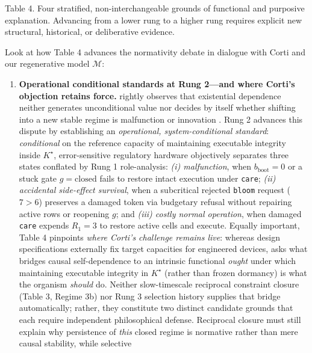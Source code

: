 \documentclass[11pt,a4paper]{article}
\providecommand{\tightlist}{\setlength{\itemsep}{2pt}\setlength{\parskip}{0pt}}
\begin{document}
Table 4. Four stratified, non-interchangeable grounds of functional and
purposive explanation. Advancing from a lower rung to a higher rung
requires explicit new structural, historical, or deliberative evidence.

Look at how Table 4 advances the normativity debate in dialogue with
Corti and our regenerative model \(\mathcal{M}\):

\begin{enumerate}
\def\labelenumi{\arabic{enumi}.}
\tightlist
\item
  \textbf{Operational conditional standards at Rung 2---and where
  Corti's objection retains force.} \citet{corti2023} rightly observes
  that existential dependence neither generates unconditional value
  \citep{bedau1992} nor decides by itself whether shifting into a new
  stable regime is malfunction or innovation
  \citep[§§4--6]{cuciniello2026}. Rung 2 advances this dispute by
  establishing an \emph{operational, system-conditional standard}:
  \emph{conditional} on the reference capacity of maintaining executable
  integrity inside \(K^\star\), error-sensitive regulatory hardware
  \citep{nagel1977, diPaolo2005, bich2024, walsh2015} objectively
  separates three states conflated by Rung 1 role-analysis: \emph{(i)
  malfunction}, when \(b_{\mathrm{boot}} = 0\) or a stuck gate
  \(g = \mathrm{closed}\) fails to restore intact execution under
  \texttt{care}; \emph{(ii) accidental side-effect survival}, when a
  subcritical rejected \texttt{bloom} request (\(7 > 6\)) preserves a
  damaged token via budgetary refusal without repairing active rows or
  reopening \(g\); and \emph{(iii) costly normal operation}, when
  damaged \texttt{care} expends \(R_1 = 3\) to restore active cells and
  execute. Equally important, Table 4 pinpoints \emph{where Corti's
  challenge remains live}: whereas design specifications externally fix
  target capacities for engineered devices, \citet{corti2023} asks what
  bridges causal self-dependence to an intrinsic functional \emph{ought}
  under which maintaining executable integrity in \(K^\star\) (rather
  than frozen dormancy) is what the organism \emph{should} do. Neither
  slow-timescale reciprocal constraint closure
  \citep{montevilMossio2015} (Table 3, Regime 3b) nor Rung 3 selection
  history \citep{millikan1984, garson2019} supplies that bridge
  automatically; rather, they constitute two distinct candidate grounds
  that each require independent philosophical defense. Reciprocal
  closure must still explain why persistence of \emph{this} closed
  regime is normative rather than mere causal stability, while selective

\end{enumerate}
\end{document}
